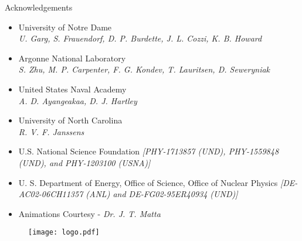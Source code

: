 \documentclass [aspectratio=169]{beamer}
\begin{document}
\begin{frame}{Acknowledgements}
\begin{multicols}{2}
\begin{itemize}
\item{University of Notre Dame \\
\textit{\scriptsize{\color{violet}U. Garg, S. Frauendorf, D. P. Burdette, J. L. Cozzi, K. B. Howard}}}
\item{Argonne National Laboratory \\
\textit{\scriptsize{\color{violet}S. Zhu, M. P. Carpenter, F. G. Kondev, T. Lauritsen, D. Seweryniak}}}
\item{United States Naval Academy \\
\textit{\scriptsize{\color{violet}A. D. Ayangeakaa, D. J. Hartley}}}
\item{University of North Carolina \\
\textit{\scriptsize{\color{violet}R. V. F. Janssens}}}
\item{U.S. National Science Foundation \textit{\scriptsize{\color{violet}[PHY-1713857 (UND), PHY-1559848 (UND), and PHY-1203100 (USNA)]}}}
\item{U. S. Department of Energy, Office of Science, Office of Nuclear Physics \textit{\scriptsize{\color{violet}[DE-AC02-06CH11357 (ANL) and DE-FG02-95ER40934 (UND)]}}}
\item{Animations Courtesy - \textit{\scriptsize{\color{violet}Dr. J. T. Matta}}}
\end{itemize}
\begin{figure}
\texttt{[image: logo.pdf]}
\end{figure}
\end{multicols}
\end{frame}
\end{document}

